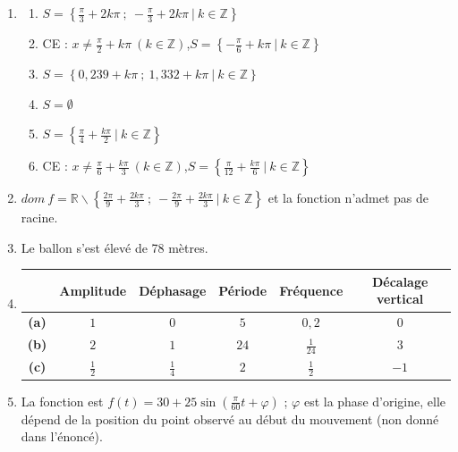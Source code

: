 \documentclass[a4paper,fontsize=13pt]{scrreprt}
\theoremstyle{plain}
\theoremstyle{definition}
\newcommand{\zz}{\mathbb{Z}}
\newcommand{\rr}{\mathbb{R}}
\newenvironment{benumerate}[1][0pt]{\begin{enumerate}\renewcommand{\makelabel}[1]{\textbf{##1}}\setlength{\itemsep}{#1}}{\end{enumerate}}
\renewcommand{\d}{\displaystyle}
\begin{document}
\begin{benumerate}[10pt]

\item \begin{benumerate}[5pt]
\item $\d S = \left\{ \frac{\pi}{3}+2k\pi ~;~ -\frac{\pi}{3}+2k\pi~|~k\in\zz \right\}$
\item CE : $\d x \neq \frac{\pi}{2}+k\pi ~(k\in\zz)$,\quad $\d S = \left\{ -\frac{\pi}{6}+k\pi~|~ k \in \zz\right\}$
\item $\d S = \left\{ 0,239+k\pi~;~1,332+k\pi ~|~k\in\zz \right\}$
\item $\d S = \emptyset$
\item $\d S = \left\{ \frac{\pi}{4}+\frac{k\pi}{2}~|~k\in\zz\right\}$
\item CE : $\d x \neq \frac{\pi}{6}+\frac{k\pi}{3} ~(k\in\zz)$,\quad $\d S = \left\{ \frac{\pi}{12}+\frac{k\pi}{6}~|~k\in\zz \right\}$
\end{benumerate}

\item $\d dom~f = \rr \backslash\left\{ \frac{2\pi}{9}+\frac{2k\pi}{3} ~;~ -\frac{2\pi}{9}+\frac{2k\pi}{3}~|~k\in\zz \right\}$ et la fonction n'admet pas de racine.

\item Le ballon s'est élevé de 78 mètres.

\renewcommand{\arraystretch}{1.2}

\item \begin{tabular}{|c|c|c|c|c|c|}
\hline
 & Amplitude & Déphasage & Période & Fréquence & Décalage vertical \\
\hline
\textbf{(a)} & $1$ & $0$ & $5$ & $0,2$ & $0$ \\
\hline 
\textbf{(b)} & $2$ & $1$ & $24$ & $\d \frac{1}{24}$ & $3$ \\
\hline
\textbf{(c)} & $\d \frac{1}{2}$ & $\d \frac{1}{4}$ & $2$ & $\d \frac{1}{2}$ & $-1$ \\
\hline
\end{tabular}

\item La fonction est $\d f(t)=30+25\sin\left(\frac{\pi}{60}t+\varphi\right)$ ; $\varphi$ est la phase d'origine, elle dépend de la position du point observé au début du mouvement (non donné dans l'énoncé).


\end{benumerate}
\end{document}
